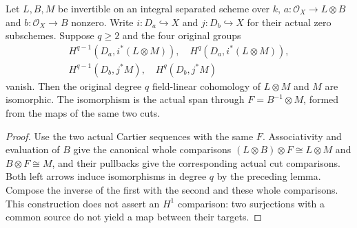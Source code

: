 \begin{lemma}
\label{lem:seshadri-two-cut-cohomology-iso}
\leanok
Let $L,B,M$ be invertible on an integral separated scheme over $k$,
$a:\mathcal O_X\to L\otimes B$ and $b:\mathcal O_X\to B$ nonzero.
Write $i:D_a\hookrightarrow X$ and $j:D_b\hookrightarrow X$ for their
actual zero subschemes. Suppose $q\geq2$ and the four original groups
\[
\begin{gathered}
H^{q-1}(D_a,i^*(L\otimes M)),\quad H^q(D_a,i^*(L\otimes M)),\\
H^{q-1}(D_b,j^*M),\quad H^q(D_b,j^*M)
\end{gathered}
\]
vanish. Then the original degree $q$ field-linear cohomology of
$L\otimes M$ and $M$ are isomorphic. The isomorphism is the actual span
through $F=B^{-1}\otimes M$, formed from the maps of the same two cuts.
\end{lemma}
\begin{proof}
Use the two actual Cartier sequences with the same $F$.
Associativity and evaluation of $B$ give the canonical whole comparisons
$(L\otimes B)\otimes F\cong L\otimes M$ and $B\otimes F\cong M$,
and their pullbacks give the corresponding actual cut comparisons.
Both left arrows induce isomorphisms in degree $q$ by the preceding lemma.
Compose the inverse of the first with the second and these whole
comparisons. This construction does not assert an $H^1$ comparison:
two surjections with a common source do not yield a map between their targets.
\end{proof}

